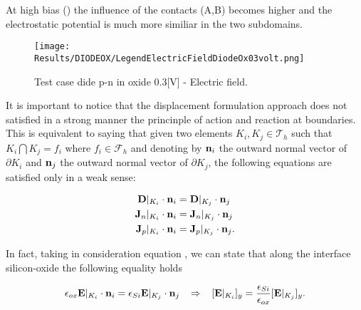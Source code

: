 At high bias () the influence of the contacts (A,B) becomes higher and the electrostatic potential is much more similiar in the two subdomains.


\vspace{1cm}

\begin{figure}[!h]
\centering
{}
\hspace{0.05\textwidth}
\hspace{0.04\textwidth}
{\texttt{[image: Results/DIODEOX/LegendElectricFieldDiodeOx03volt.png]}}
\caption{Test case dide p-n in oxide 0.3[V] - Electric field.}
\label{fig: electric field diode}
\end{figure}

\vspace{0.5cm}


It is important to notice that the displacement formulation approach does not satisfied  in a strong manner the princinple of action and reaction at boundaries.
This is equivalent to saying that given two elements $K_i,K_j\in \mathcal{T}_h$ such that $K_i \bigcap K_j = f_i$ where $f_i \in \mathcal{F}_h$ and denoting by $\mathbf{n}_{i}$ the outward normal vector of $\partial K_i$ and $\mathbf{n}_{j}$ the outward normal vector of $\partial K_j$,  the following equations are satisfied only in a weak sense:

\begin{align}
\mathbf{D}|_{K_i}\cdot \mathbf{n}_{i} & = \mathbf{D}|_{K_j} \cdot \mathbf{n}_{j} \label{eq: conservazione vettore spostamento}\\
\mathbf{J}_n|_{K_i}\cdot \mathbf{n}_{i} & = \mathbf{J}_n|_{K_j}\cdot \mathbf{n}_{j} \\
\mathbf{J}_p|_{K_i}\cdot \mathbf{n}_{i} & = \mathbf{J}_p|_{K_j}\cdot \mathbf{n}_{j} .
\end{align}


In fact, taking in consideration equation , we can state that along the interface silicon-oxide the following equality holds

\begin{equation}
\label{eq: rapporto campi}
\epsilon_{ox}\vect{E}|_{K_i}\cdot \vect{n}_{i} = \epsilon_{Si}\vect{E}|_{K_j} \cdot \vect{n}_{j} \psp{5} \Rightarrow \psp{5}  [\vect{E}|_{K_i}]_y = \dfrac{\epsilon_{Si}}{\epsilon_{ox}}[\vect{E}|_{K_j}]_y.
\end{equation}  


